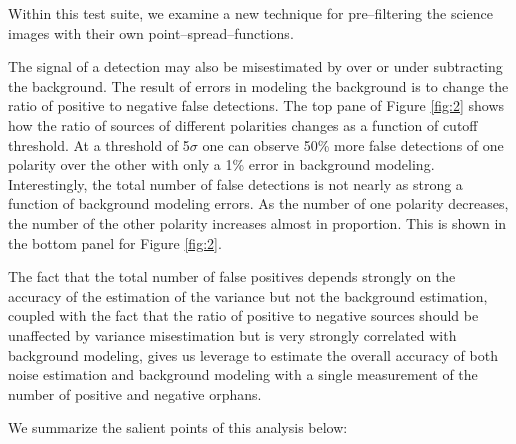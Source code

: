 \documentclass[floatfix, apj]{emulateapj}
\begin{document}
Within this test suite, we examine a new technique for pre--filtering the science images with their own point--spread--functions.

The signal of a detection may also be misestimated by over or under subtracting the background.
The result of errors in modeling the background is to change the ratio of positive to negative false detections.
The top pane of Figure \ref{fig:2} shows how the ratio of sources of different polarities changes as a function of cutoff threshold.
At a threshold of 5$\sigma$ one can observe 50\% more false detections of one polarity over the other with only a 1\% error in background modeling.
Interestingly, the total number of false detections is not nearly as strong a function of background modeling errors.
As the number of one polarity decreases, the number of the other polarity increases almost in proportion.
This is shown in the bottom panel for Figure \ref{fig:2}.

The fact that the total number of false positives depends strongly on the accuracy of the estimation of the variance but not the background estimation, coupled with the fact that the ratio of positive to negative sources should be unaffected by variance misestimation but is very strongly correlated with background modeling, gives us leverage to estimate the overall accuracy of both noise estimation and background modeling with a single measurement of the number of positive and negative orphans.

We summarize the salient points of this analysis below:
\end{document}
